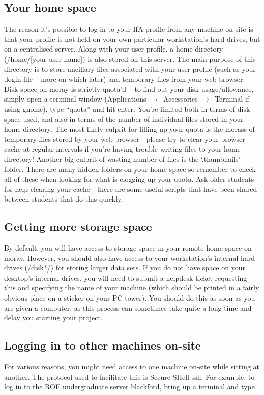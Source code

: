 \subsection{Your home space}
The reason it's possible to log in to your IfA profile from any machine on site is that your profile is not held on your own particular workstation's hard drives, but on a centralised server. Along with your user profile, a home directory (/home/[your user name]) is also stored on this server. The main purpose of this directory is to store ancillary files associated with your user profile (such as your .login file -- more on which later) and temporary files from your web browser. Disk space on {\sc moray} is strictly quota'd -- to find out your disk usage/allowance, simply open a terminal window (Applications $\rightarrow$\ Accessories $\rightarrow$\ Terminal if using {\sc gnome}), type ``quota'' and hit enter. You're limited both in terms of disk space used, and also in terms of the number of individual files stored in your home directory. The most likely culprit for filling up your quota is the morass of temporary files stored by your web browser - please try to clear your browser cache at regular intervals if you're having trouble writing files to your home directory! Another big culprit
of wasting number of files is the `.thumbnails' folder. There are many hidden folders on your home space so remember to
check all of these when looking for what is clogging up your quota. Ask older students for help clearing your cache - there are some useful scripts that have been shared between students that do this quickly.

\subsection{Getting more storage space}
By default, you will have access to storage space in your remote home space on {\sc moray}. However, you should also have access to your workstation's internal hard drives (/disk*/) for storing larger data sets.  If you do not have space on your desktop's internal drives, you will need to submit a helpdesk ticket requesting this and specifying the name of your machine (which should be printed in a fairly obvious place on a sticker on your PC tower). You should do this as soon as you are given a computer, as this process can sometimes take quite a long time and delay you starting your project.


\subsection{Logging in to other machines on-site}
For various reasons, you might need access to one machine on-site while sitting at another. The protocol used to facilitate this is Secure SHell {\sc ssh}. For example, to log in to the ROE undergraduate server {\sc blackford}, bring up a terminal and type

